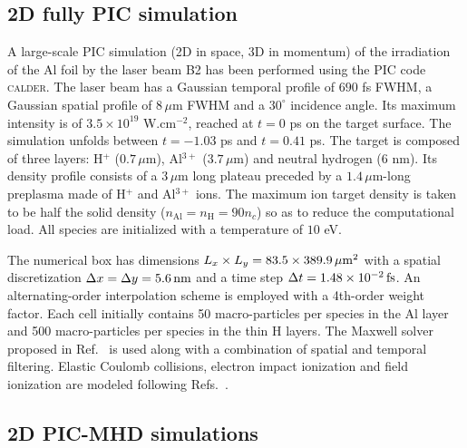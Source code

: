 \documentclass[aps,twocolumn,showpacs,superscriptaddress]{revtex4}
\begin{document}
\subsection*{2D fully PIC simulation}

A large-scale PIC simulation (2D in space, 3D in momentum) of the irradiation of the Al foil by the laser beam B2 has been performed using the PIC code \textsc{calder}. The laser beam has a Gaussian temporal profile of $690$ fs FWHM, a Gaussian spatial profile of $8\, \mu$m FWHM and a $30^\circ$ incidence angle. Its maximum intensity is of $3.5 \times 10^{19}$ W.cm$^{-2}$, reached at $t=0$ ps on the target surface. The simulation unfolds between $t = -1.03$ ps and $t = 0.41$ ps. The target is composed of three layers: H$^+$ ($0.7\,\mu$m), Al$^{3+}$ ($3.7\,\mu$m) and neutral hydrogen ($6$ nm). Its density profile consists of a $3\, \mu$m long plateau preceded by a $1.4\,\mu$m-long preplasma made of H$^+$ and Al$^{3+}$ ions. The maximum ion target density is taken to be half the solid density ($n_\mathrm{Al}=n_\mathrm{H}=90 n_c$) so as to reduce the computational load. All species are initialized with a temperature of $10$ eV.

The numerical box has dimensions $L_x \times L_y = 83.5 \times 389.9\,\rm \mu m^2$ with a spatial discretization $\Delta x = \Delta y = 5.6\,\rm nm$ and a time step $\Delta t = 1.48\times 10^{-2}\,\rm fs$. An alternating-order interpolation scheme \cite{CPC_Sokolov_2013} is employed with a 4th-order weight factor. Each cell initially contains 50 macro-particles per species in the Al layer and 500 macro-particles per species in the thin H layers. The Maxwell solver proposed in Ref.~\cite{PRSTAB_Lehe_2013} is used along with a combination of spatial \cite{JCP_Vay_2011} and temporal \cite{JCP_Friedman_1990} filtering. Elastic Coulomb collisions, electron impact ionization and field ionization are modeled following Refs.~\cite{POP_Perez_2012}.

\subsection*{2D PIC-MHD simulations}
\end{document}
